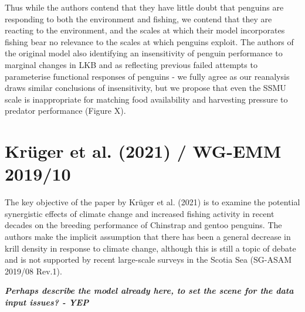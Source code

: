\documentclass[]{elsarticle} %
\begin{document}
Thus while the authors contend that they have little doubt that penguins
are responding to both the environment and fishing, we contend that they
are reacting to the environment, and the scales at which their model
incorporates fishing bear no relevance to the scales at which penguins
exploit. The authors of the original model also identifying an
insensitivity of penguin performance to marginal changes in LKB and as
reflecting previous failed attempts to parameterise functional responses
of penguins - we fully agree as our reanalysis draws similar conclusions
of insensitivity, but we propose that even the SSMU scale is
inappropriate for matching food availability and harvesting pressure to
predator performance (Figure X).

\hypertarget{kruger2021-wg-emm-201910}{%
\section{Krüger et al. (2021) / WG-EMM
2019/10}\label{kruger2021-wg-emm-201910}}

The key objective of the paper by Krüger et al. (2021) is to examine the
potential synergistic effects of climate change and increased fishing
activity in recent decades on the breeding performance of Chinstrap and
gentoo penguins. The authors make the implicit assumption that there has
been a general decrease in krill density in response to climate change,
although this is still a topic of debate and is not supported by recent
large-scale surveys in the Scotia Sea (SG-ASAM 2019/08 Rev.1).

\textbf{\emph{Perhaps describe the model already here, to set the scene
for the data input issues? - YEP}}
\end{document}
